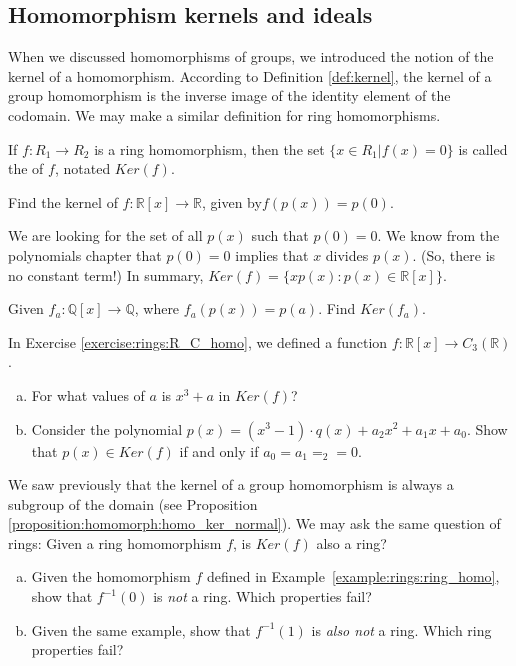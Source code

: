 \subsection{Homomorphism kernels and ideals}

When we discussed homomorphisms of groups, we introduced the notion of the kernel of a homomorphism.  According to Definition \ref{def:kernel}, the kernel of a group homomorphism is the inverse image of the identity element of the codomain.  We may make a similar definition for ring homomorphisms.  

\begin{defn}\label{kernel}
If $f:R_1\rightarrow R_2$ is a ring homomorphism, then the set $\{x\in R_1|f(x)=0\}$ is called the  of $f$, notated $Ker(f)$.
\end{defn}

\begin{example}
Find the kernel of $f:{\mathbb R}[x]\rightarrow{\mathbb R}$, given by$f(p(x))=p(0)$.

We are looking for the set of all $p(x)$ such that $p(0)=0$. 
We know from the polynomials chapter that $p(0)=0$ implies that $x$ divides $p(x)$.  (So, there is no constant term!)  In summary, $Ker(f)=\{xp(x): p(x)\in{\mathbb R}[x]\}$.
\end{example}

\begin{exercise}
Given $f_a:{\mathbb Q}[x]\rightarrow{\mathbb Q}$, where $f_a(p(x))=p(a)$.  Find $Ker(f_a)$.
\end{exercise}

\begin{exercise}
In Exercise \ref{exercise:rings:R_C_homo}, we defined a function $f:{\mathbb R}[x]\rightarrow C_3({\mathbb R})$.
\begin{enumerate}[(a)]
\item For what values of $a$ is $x^3+a$ in $Ker(f)$?
\item Consider the polynomial $p(x)=(x^3-1)\cdot q(x)+a_2x^2+a_1x+a_0$.  Show that $p(x)\in Ker(f)$ if and only if $a_0=a_1=_2=0$.
\end{enumerate}
\end{exercise}

We saw previously that the kernel of a group homomorphism is always a subgroup of the domain (see Proposition \ref{proposition:homomorph:homo_ker_normal}).  We may ask the same question of rings:  Given a ring homomorphism $f$, is $Ker(f)$ also a ring?

\begin{exercise}
\begin{enumerate}[(a)]
    \item Given the homomorphism $f$ defined in Example~\ref{example:rings:ring_homo}, show that $f^{-1}(0)$ is \emph{not} a ring.  Which properties fail?
    \item Given the same example, show that $f^{-1}(1)$ is \emph{also not} a ring.  Which ring properties fail?
\end{enumerate}
\end{exercise}

